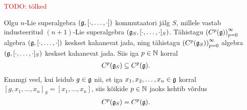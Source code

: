 \textcolor{red}{TODO: tõlked}
\begin{lau}
    Olgu $n$-Lie superalgebra $(\mathfrak{g}, [\cdot, \dots, \cdot])$
    kommutaatori jälg $S$, millele vastab industeeritud
    $(n+1)$-Lie superalgebra $(\mathfrak{g}_S, [\cdot, \dots, \cdot]_S)$.
    Tähistagu $\left(C^p(\mathfrak{g})\right)_{p=0}^\infty$ algebra
    $(\mathfrak{g}, [\cdot, \dots, \cdot])$
    keskset kahanevat jada, ning tähistagu
    $\left(C^p(\mathfrak{g}_S)\right)_{p=0}^\infty$ algebra
    $(\mathfrak{g}, [\cdot, \dots, \cdot]_S)$
    keskset kahanevat jada. Siis iga $p \in \mathbb{N}$ korral
    \begin{align*}
        C^p(\mathfrak{g}_S) \subseteq C^p(\mathfrak{g}).
    \end{align*}
    Enamgi veel, kui leidub $g \in \mathfrak{g}$ nii, et iga
    $x_1, x_2, \dots, x_n \in \mathfrak{g}$ korral
    $[g, x_1, \dots, x_n]_S = [x_1, \dots, x_n]$, siis
    kõikide $p \in \mathbb{N}$ jaoks kehtib võrdus
    \begin{align*}
        C^p(\mathfrak{g}_S) = C^p(\mathfrak{g}).
    \end{align*}
\end{lau}

